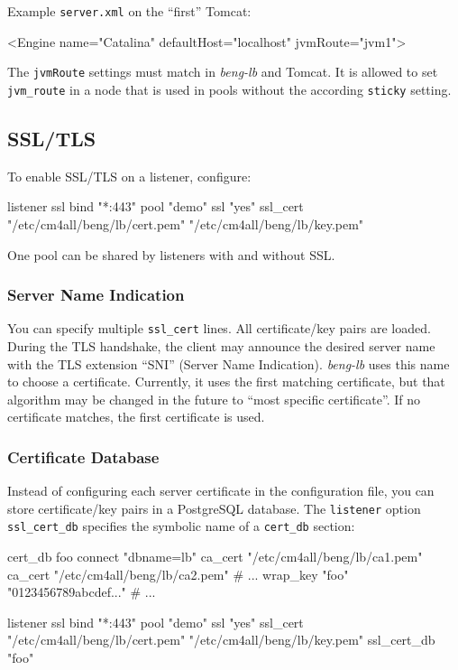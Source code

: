 \documentclass[a4paper,12pt]{article}
\begin{document}
Example \texttt{server.xml} on the ``first'' Tomcat:

\begin{verbatim*}
<Engine name="Catalina" defaultHost="localhost" jvmRoute="jvm1">
\end{verbatim*}

The \verb|jvmRoute| settings must match in \emph{beng-lb} and Tomcat.
It is allowed to set \verb|jvm_route| in a node that is used in pools
without the according \verb|sticky| setting.

\subsection{SSL/TLS}

To enable SSL/TLS on a listener, configure:

\begin{verbatim*}
listener ssl {
  bind "*:443"
  pool "demo"
  ssl "yes"
  ssl_cert "/etc/cm4all/beng/lb/cert.pem" "/etc/cm4all/beng/lb/key.pem"
}
\end{verbatim*}

One pool can be shared by listeners with and without SSL.

\subsubsection{Server Name Indication}

You can specify multiple \verb|ssl_cert| lines.  All certificate/key
pairs are loaded.  During the TLS handshake, the client may announce
the desired server name with the TLS extension ``SNI'' (Server Name
Indication).  \emph{beng-lb} uses this name to choose a certificate.
Currently, it uses the first matching certificate, but that algorithm
may be changed in the future to ``most specific certificate''.  If no
certificate matches, the first certificate is used.

\subsubsection{Certificate Database}
\label{certdbconfig}

Instead of configuring each server certificate in the configuration
file, you can store certificate/key pairs in a PostgreSQL database.
The \texttt{listener} option \verb|ssl_cert_db| specifies the symbolic
name of a \verb|cert_db| section:

\begin{verbatim*}
cert_db foo {
  connect "dbname=lb"
  ca_cert "/etc/cm4all/beng/lb/ca1.pem"
  ca_cert "/etc/cm4all/beng/lb/ca2.pem"
  # ...
  wrap_key "foo" "0123456789abcdef..."
  # ...
}

listener ssl {
  bind "*:443"
  pool "demo"
  ssl "yes"
  ssl_cert "/etc/cm4all/beng/lb/cert.pem" "/etc/cm4all/beng/lb/key.pem"
  ssl_cert_db "foo"
}
\end{verbatim*}
\end{document}
